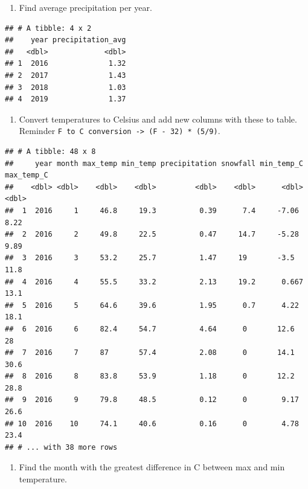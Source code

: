 \documentclass[
]{book}
\providecommand{\tightlist}{%
  \setlength{\itemsep}{0pt}\setlength{\parskip}{0pt}}
\begin{document}
\begin{enumerate}
\def\labelenumi{\arabic{enumi}.}
\setcounter{enumi}{5}
\tightlist
\item
  Find average precipitation per year.
\end{enumerate}

\begin{verbatim}
## # A tibble: 4 x 2
##    year precipitation_avg
##   <dbl>             <dbl>
## 1  2016              1.32
## 2  2017              1.43
## 3  2018              1.03
## 4  2019              1.37
\end{verbatim}

\begin{enumerate}
\def\labelenumi{\arabic{enumi}.}
\setcounter{enumi}{6}
\tightlist
\item
  Convert temperatures to Celsius and add new columns with these to table. Reminder \texttt{F\ to\ C\ conversion\ -\textgreater{}\ (F\ -\ 32)\ *\ (5/9)}.
\end{enumerate}

\begin{verbatim}
## # A tibble: 48 x 8
##     year month max_temp min_temp precipitation snowfall min_temp_C max_temp_C
##    <dbl> <dbl>    <dbl>    <dbl>         <dbl>    <dbl>      <dbl>      <dbl>
##  1  2016     1     46.8     19.3          0.39      7.4     -7.06        8.22
##  2  2016     2     49.8     22.5          0.47     14.7     -5.28        9.89
##  3  2016     3     53.2     25.7          1.47     19       -3.5        11.8 
##  4  2016     4     55.5     33.2          2.13     19.2      0.667      13.1 
##  5  2016     5     64.6     39.6          1.95      0.7      4.22       18.1 
##  6  2016     6     82.4     54.7          4.64      0       12.6        28   
##  7  2016     7     87       57.4          2.08      0       14.1        30.6 
##  8  2016     8     83.8     53.9          1.18      0       12.2        28.8 
##  9  2016     9     79.8     48.5          0.12      0        9.17       26.6 
## 10  2016    10     74.1     40.6          0.16      0        4.78       23.4 
## # ... with 38 more rows
\end{verbatim}

\begin{enumerate}
\def\labelenumi{\arabic{enumi}.}
\setcounter{enumi}{7}
\tightlist
\item
  Find the month with the greatest difference in C between max and min temperature.
\end{enumerate}
\end{document}
